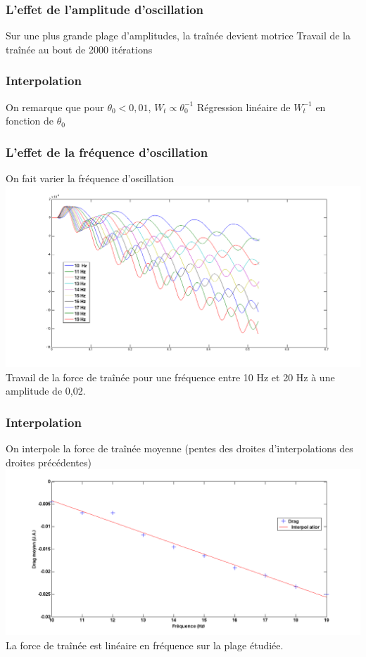 \documentclass{beamer}
\begin{document}
 	\begin{frame}
 		\frametitle{L'effet de l'amplitude d'oscillation}
 		Sur une plus grande plage d'amplitudes, la traînée devient motrice
 		Travail de la traînée au bout de 2000 itérations
 	\end{frame}
  
  	\begin{frame}
 		\frametitle{Interpolation}
 		On remarque que pour $ \theta_0 < 0,01$, $W_t \propto \theta_0^{-1}$
 		Régression linéaire de $W_t^{-1}$ en fonction de $\theta_0$
 	\end{frame}
 	
 	\begin{frame}
 		\frametitle{L'effet de la fréquence d'oscillation}
 			On fait varier la fréquence d'oscillation
 			\centering \includegraphics[width= 0.8 \linewidth]{freq0,02.png}\\
 			Travail de la force de traînée pour une fréquence entre 10 Hz et 20 Hz à une amplitude de 0,02\degre.
 	\end{frame}
 	
 	\begin{frame}
 		\frametitle{Interpolation}
 		On interpole la force de traînée moyenne (pentes des droites d'interpolations des droites précédentes)
 		\centering \includegraphics[width= 0.8 \linewidth]{modulationfreq.png} \\
 		La force de traînée est linéaire en fréquence sur la plage étudiée.
 	\end{frame}
\end{document}
